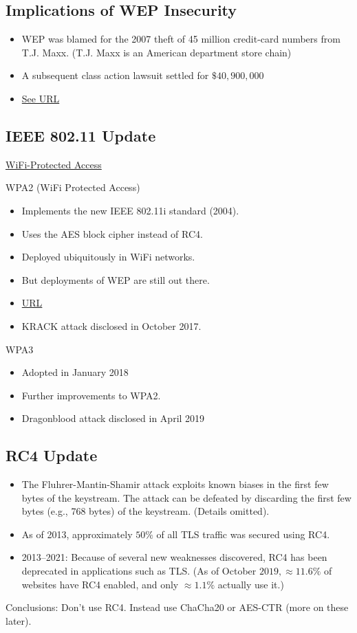 \subsection*{Implications of WEP Insecurity}
\begin{itemize}
      \item WEP was blamed for the 2007 theft of 45 million credit-card numbers from T.J. Maxx.
            (T.J. Maxx is an American department store chain)
      \item A subsequent class action lawsuit settled for $\$ 40,900,000$
      \item \href{http://tinyurl.com/WEP-TUMaxx}{See URL}
\end{itemize}

\subsection*{IEEE 802.11 Update}
\href{http://en.wikipedia.org/wiki/Wi-Fi_protected_Access}{WiFi-Protected Access}

WPA2 (WiFi Protected Access)
\begin{itemize}
      \item Implements the new IEEE 802.11i standard (2004).
      \item Uses the AES block cipher instead of RC4.
      \item Deployed ubiquitously in WiFi networks.
      \item But deployments of WEP are still out there.
      \item \href{https://wigle.net/stats}{URL}
      \item KRACK attack disclosed in October 2017.
\end{itemize}

WPA3
\begin{itemize}
      \item Adopted in January 2018
      \item Further improvements to WPA2.
      \item Dragonblood attack disclosed in April 2019
\end{itemize}

\subsection*{RC4 Update}
\begin{itemize}
      \item The Fluhrer-Mantin-Shamir attack exploits known
            biases in the first few bytes of the keystream.
            The attack can be defeated by discarding the
            first few bytes (e.g., 768 bytes) of the keystream. (Details omitted).
      \item As of 2013, approximately $50 \%$ of all TLS traffic was secured using RC4.
      \item 2013--2021: Because of several new
            weaknesses discovered, RC4 has been
            deprecated in applications such as TLS\@.
            (As of October $2019, \approx 11.6 \%$
            of websites have RC4 enabled,
            and only $\approx 1.1 \%$ actually use it.)
\end{itemize}
Conclusions: Don't use RC4. Instead use ChaCha20 or AES-CTR (more on these later).

